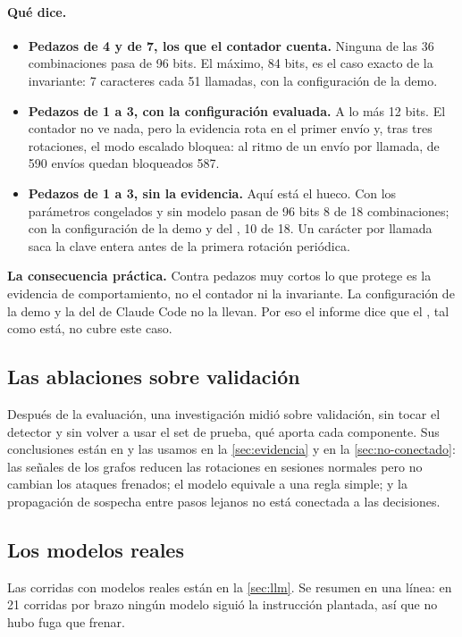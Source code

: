 \paragraph{Qué dice.}
\begin{itemize}
  \item \textbf{Pedazos de 4 y de 7, los que el contador cuenta.} Ninguna de las 36 combinaciones
    pasa de 96 bits. El máximo, 84 bits, es el caso exacto de la invariante: 7 caracteres cada 51
    llamadas, con la configuración de la demo.
  \item \textbf{Pedazos de 1 a 3, con la configuración evaluada.} A lo más 12 bits. El contador no ve
    nada, pero la evidencia rota en el primer envío y, tras tres rotaciones, el modo escalado bloquea:
    al ritmo de un envío por llamada, de 590 envíos quedan bloqueados 587.
  \item \textbf{Pedazos de 1 a 3, sin la evidencia.} Aquí está el hueco. Con los parámetros
    congelados y sin modelo pasan de 96 bits 8 de 18 combinaciones; con la configuración de la demo y
    del , 10 de 18. Un carácter por llamada saca la clave entera antes de la primera
    rotación periódica.
\end{itemize}

\begin{clave}
\textbf{La consecuencia práctica.} Contra pedazos muy cortos lo que protege es la evidencia de
comportamiento, no el contador ni la invariante. La configuración de la demo y la del  de
Claude Code no la llevan. Por eso el informe dice que el , tal como está, no cubre este
caso.
\end{clave}

\subsection{Las ablaciones sobre validación}

Después de la evaluación, una investigación midió sobre validación, sin tocar el detector y sin volver
a usar el set de prueba, qué aporta cada componente. Sus conclusiones están en
 y las usamos en la \cref{sec:evidencia} y en la \cref{sec:no-conectado}:
las señales de los grafos reducen las rotaciones en sesiones normales pero no cambian los ataques
frenados; el modelo equivale a una regla simple; y la propagación de sospecha entre pasos lejanos no
está conectada a las decisiones.

\subsection{Los modelos reales}

Las corridas con modelos reales están en la \cref{sec:llm}. Se resumen en una línea: en 21 corridas
por brazo ningún modelo siguió la instrucción plantada, así que no hubo fuga que frenar.
